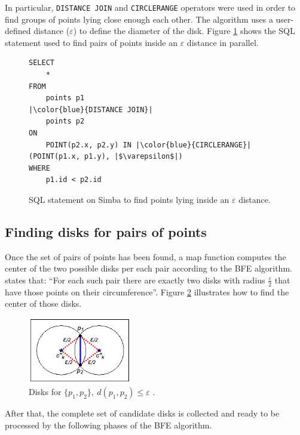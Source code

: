 \documentclass[12pt]{scrartcl}
\begin{document}
In particular, \texttt{DISTANCE JOIN} and \texttt{CIRCLERANGE} operators were used in order to find groups of points lying close enough each other.  The algorithm uses a user-defined distance ($\varepsilon$) to define the diameter of the disk.  Figure \ref{fig:sql} shows the SQL statement used to find pairs of points inside an $\varepsilon$ distance in parallel.

\begin{figure}
 \centering
    \begin{verbatim}
SELECT 
	* 
FROM 
	points p1
|\color{blue}{DISTANCE JOIN}|
	points p2 
ON 
	POINT(p2.x, p2.y) IN |\color{blue}{CIRCLERANGE}|(POINT(p1.x, p1.y), |$\varepsilon$|)
WHERE 
	p1.id < p2.id
    \end{verbatim}
 \caption{SQL statement on Simba to find points lying inside an $\varepsilon$ distance.}
 \label{fig:sql}
\end{figure}

\subsection{Finding disks for pairs of points}
Once the set of pairs of points has been found, a map function computes the center of the two possible disks per each pair according to the BFE algorithm.  \cite{vieira_-line_2009} states that:  ``For each such pair there are exactly two disks with radius $\frac{\varepsilon}{2}$ that have those points on their circumference''.  Figure \ref{fig:theorem} illustrates how to find the center of those disks.

\begin{figure}
 \centering
 \includegraphics[width=0.4\textwidth]{figures/theorem} 
 \caption{Disks for $\{p_1,p_2\},\ d(p_1,p_2) \leq \varepsilon$ \citep{vieira_-line_2009}.}
 \label{fig:theorem}
\end{figure}

After that, the complete set of candidate disks is collected and ready to be processed by the following phases of the BFE algorithm. 
\end{document}

